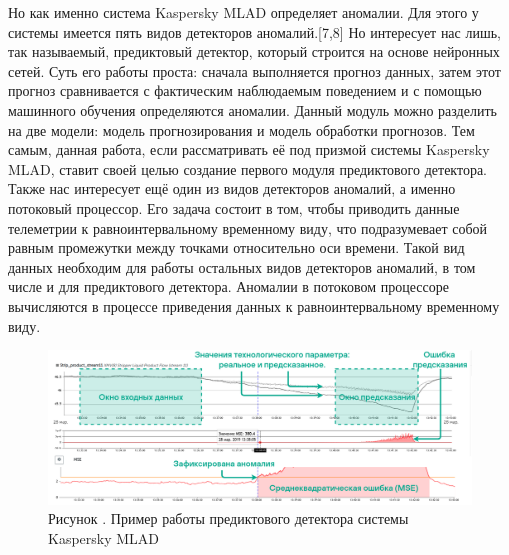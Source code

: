 {  \par \redline Но как именно система Kaspersky MLAD определяет аномалии. Для этого у системы имеется пять видов детекторов аномалий.[7,8] Но интересует нас лишь, так называемый, предиктовый детектор, который строится на основе нейронных сетей. Суть его работы проста: сначала выполняется прогноз данных, затем этот прогноз сравнивается с фактическим наблюдаемым поведением и с помощью машинного обучения определяются аномалии. Данный модуль можно разделить на две модели: модель прогнозирования и модель обработки прогнозов. Тем самым, данная работа, если рассматривать её под призмой системы Kaspersky MLAD, ставит своей целью создание первого модуля предиктового детектора. Также нас интересует ещё один из видов детекторов аномалий, а именно потоковый процессор. Его задача состоит в том, чтобы приводить данные телеметрии к равноинтервальному временному виду, что подразумевает собой равным промежутки между точками относительно оси времени. Такой вид данных необходим для работы остальных видов детекторов аномалий, в том числе и для предиктового детектора. Аномалии в потоковом процессоре вычисляются в процессе приведения данных к равноинтервальному временному виду.

  \begin{figure}
    \centering
    \def\svgwidth{\textwidth}
    \includegraphics[scale=0.6]{images/MLADex.png}
    \caption*{\gostFont Рисунок \thechaptercntr .\theimagecntr \spc {--} Пример работы предиктового детектора системы Kaspersky MLAD}
    \label{fig:PredictDetector}
  \end{figure}

}
